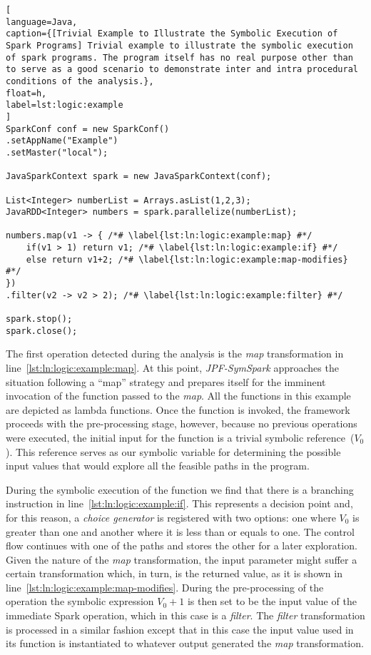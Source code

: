 \begin{lstlisting}[
language=Java,
caption={[Trivial Example to Illustrate the Symbolic Execution of Spark Programs] Trivial example to illustrate the symbolic execution of spark programs. The program itself has no real purpose other than to serve as a good scenario to demonstrate inter and intra procedural conditions of the analysis.},
float=h,
label=lst:logic:example
]
SparkConf conf = new SparkConf()
.setAppName("Example")
.setMaster("local");

JavaSparkContext spark = new JavaSparkContext(conf);

List<Integer> numberList = Arrays.asList(1,2,3);
JavaRDD<Integer> numbers = spark.parallelize(numberList);

numbers.map(v1 -> { /*# \label{lst:ln:logic:example:map} #*/
	if(v1 > 1) return v1; /*# \label{lst:ln:logic:example:if} #*/
	else return v1+2; /*# \label{lst:ln:logic:example:map-modifies} #*/
})
.filter(v2 -> v2 > 2); /*# \label{lst:ln:logic:example:filter} #*/

spark.stop();
spark.close();
\end{lstlisting}

The first operation detected during the analysis is the \textit{map} transformation in line~\ref{lst:ln:logic:example:map}. At this point, \textit{JPF-SymSpark} approaches the situation following a ``map'' strategy and prepares itself for the imminent invocation of the function passed to the \textit{map}. All the functions in this example are depicted as lambda functions. Once the function is invoked, the framework proceeds with the pre-processing stage, however, because no previous operations were executed, the initial input for the function is a trivial symbolic reference~($V_0$). This reference serves as our symbolic variable for determining the possible input values that would explore all the feasible paths in the program.

During the symbolic execution of the function we find that there is a branching instruction in line~\ref{lst:ln:logic:example:if}. This represents a decision point and, for this reason, a \textit{choice generator} is registered with two options: one where $V_0$ is greater than one and another where it is less than or equals to one. The control flow continues with one of the paths and stores the other for a later exploration. Given the nature of the \textit{map} transformation, the input parameter might suffer a certain transformation which, in turn, is the returned value, as it is shown in line~\ref{lst:ln:logic:example:map-modifies}. During the pre-processing of the operation the symbolic expression $V_0 + 1$ is then set to be the input value of the immediate Spark operation, which in this case is a \textit{filter}. The \textit{filter} transformation is processed in a similar fashion except that in this case the input value used in its function is instantiated to whatever output generated the \textit{map} transformation.


